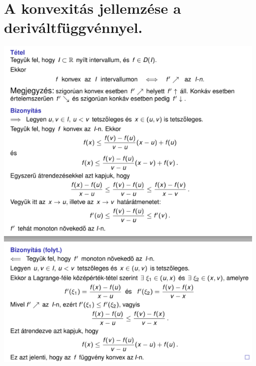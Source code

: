 \documentclass[10pt,a4paper]{article}
\begin{document}
\section{A konvexitás jellemzése a deriváltfüggvénnyel.}
\includegraphics[scale=1]{10.PNG}
\newpage
\end{document}
